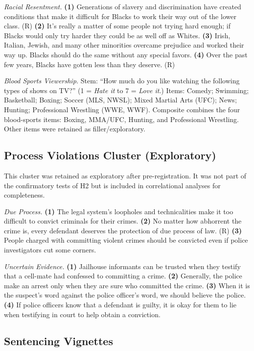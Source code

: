 \textit{Racial Resentment.} \textbf{(1)} Generations of slavery and discrimination have created conditions that make it difficult for Blacks to work their way out of the lower class. (R) \textbf{(2)} It's really a matter of some people not trying hard enough; if Blacks would only try harder they could be as well off as Whites. \textbf{(3)} Irish, Italian, Jewish, and many other minorities overcame prejudice and worked their way up. Blacks should do the same without any special favors. \textbf{(4)} Over the past few years, Blacks have gotten less than they deserve. (R)

\textit{Blood Sports Viewership.} Stem: ``How much do you like watching the following types of shows on TV?'' (1 = \textit{Hate it} to 7 = \textit{Love it}.) Items: Comedy; Swimming; Basketball; Boxing; Soccer (MLS, NWSL); Mixed Martial Arts (UFC); News; Hunting; Professional Wrestling (WWE, WWF). Composite combines the four blood-sports items: Boxing, MMA/UFC, Hunting, and Professional Wrestling. Other items were retained as filler/exploratory.

\subsection{Process Violations Cluster (Exploratory)}

This cluster was retained as exploratory after pre-registration. It was not part of the confirmatory tests of H2 but is included in correlational analyses for completeness.

\textit{Due Process.} \textbf{(1)} The legal system's loopholes and technicalities make it too difficult to convict criminals for their crimes. \textbf{(2)} No matter how abhorrent the crime is, every defendant deserves the protection of due process of law. (R) \textbf{(3)} People charged with committing violent crimes should be convicted even if police investigators cut some corners.

\textit{Uncertain Evidence.} \textbf{(1)} Jailhouse informants can be trusted when they testify that a cell-mate had confessed to committing a crime. \textbf{(2)} Generally, the police make an arrest only when they are sure who committed the crime. \textbf{(3)} When it is the suspect's word against the police officer's word, we should believe the police. \textbf{(4)} If police officers know that a defendant is guilty, it is okay for them to lie when testifying in court to help obtain a conviction.

\subsection{Sentencing Vignettes}
\label{sec:supp_vignettes}

